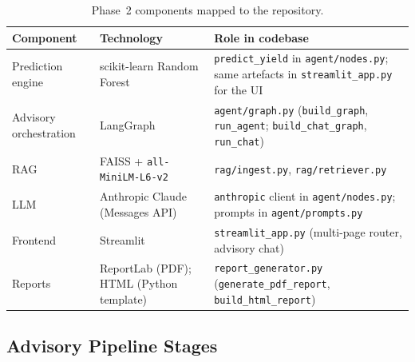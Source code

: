 \documentclass[12pt,a4paper]{article}
\begin{document}
\begin{table}[H]
\centering
\caption{Phase~2 components mapped to the repository.}
\label{tab:phase2-components}
\renewcommand{\arraystretch}{1.28}
\begin{tabularx}{\textwidth}{L{3.1cm} L{3.4cm} X}
\toprule
{}
\color{white}\textbf{Component} &
\color{white}\textbf{Technology} &
\color{white}\textbf{Role in codebase} \\
\midrule
{}
Prediction engine &
scikit-learn Random Forest &
\texttt{predict\_yield} in \texttt{agent/nodes.py}; same artefacts in \texttt{streamlit\_app.py} for the UI \\
Advisory orchestration &
LangGraph &
\texttt{agent/graph.py} (\texttt{build\_graph}, \texttt{run\_agent}; \texttt{build\_chat\_graph}, \texttt{run\_chat}) \\
RAG &
FAISS + \texttt{all-MiniLM-L6-v2} &
\texttt{rag/ingest.py}, \texttt{rag/retriever.py} \\
LLM &
Anthropic Claude (Messages API) &
\texttt{anthropic} client in \texttt{agent/nodes.py}; prompts in \texttt{agent/prompts.py} \\
Frontend &
Streamlit &
\texttt{streamlit\_app.py} (multi-page router, advisory chat) \\
Reports &
ReportLab (PDF); HTML (Python template) &
\texttt{report\_generator.py} (\texttt{generate\_pdf\_report}, \texttt{build\_html\_report}) \\
\bottomrule
\end{tabularx}
\end{table}

\subsection{Advisory Pipeline Stages}
\end{document}
